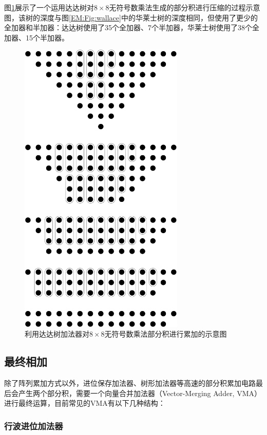 图\ref{EM:Fig:dadda}展示了一个运用达达树对$8 \times 8$无符号数乘法生成的部分积进行压缩的过程示意图，该树的深度与图\ref{EM:Fig:wallace}中的华莱士树的深度相同，但使用了更少的全加器和半加器：达达树使用了35个全加器、7个半加器，华莱士树使用了38个全加器、15个半加器。
\begin{figure}[!htb]
    \centering
    \includegraphics[width=0.7\textwidth]{figs/EM-dadda.pdf}
    \caption{利用达达树加法器对$8 \times 8$无符号数乘法部分积进行累加的示意图}
    \label{EM:Fig:dadda}
\end{figure}

\subsection{最终相加}

除了阵列累加方式以外，进位保存加法器、树形加法器等高速的部分积累加电路最后会产生两个部分积，需要一个向量合并加法器（Vector-Merging Adder, VMA）进行最终运算，目前常见的VMA有以下几种结构：

\subsubsection{行波进位加法器}

